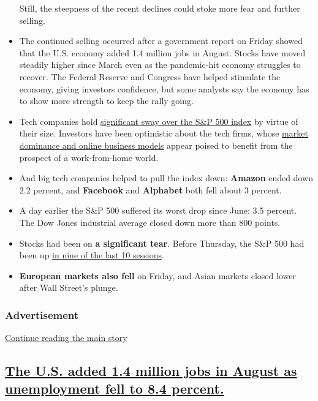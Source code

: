 \begin{itemize}
  Still, the steepness of the recent declines could stoke more fear and
  further selling.
\item
  The continued selling occurred after a government report on Friday
  showed that the U.S. economy added 1.4 million jobs in August. Stocks
  have moved steadily higher since March even as the pandemic-hit
  economy struggles to recover. The Federal Reserve and Congress have
  helped stimulate the economy, giving investors confidence, but some
  analysts say the economy has to show more strength to keep the rally
  going.
\item
  Tech companies hold
  \href{https://www.nytimes3xbfgragh.onion/2020/04/28/business/coronavirus-stocks.html}{significant
  sway over the S\&P 500 index} by virtue of their size. Investors have
  been optimistic about the tech firms, whose
  \href{https://www.nytimes3xbfgragh.onion/2020/03/23/technology/coronavirus-facebook-amazon-youtube.html}{market
  dominance and online business models} appear poised to benefit from
  the prospect of a work-from-home world.
\item
  And big tech companies helped to pull the index down: \textbf{Amazon}
  ended down 2.2 percent, and \textbf{Facebook} and \textbf{Alphabet}
  both fell about 3 percent.
\item
  A day earlier the S\&P 500 suffered its worst drop since June: 3.5
  percent. The Dow Jones industrial average closed down more than 800
  points.
\item
  Stocks had been on \textbf{a significant tear}. Before Thursday, the
  S\&P 500 had been up
  \href{https://www.nytimes3xbfgragh.onion/live/2020/09/03/business/stock-market-today-coronavirus/wall-street-has-been-on-an-extraordinary-rally-since-the-depths-of-march}{in
  nine of the last 10 sessions}.
\item
  \textbf{European markets also fell} on Friday, and Asian markets
  closed lower after Wall Street's plunge.
\end{itemize}

\hypertarget{advertisement}{%
\subsubsection{Advertisement}\label{advertisement}}

\protect\hyperlink{after-dfp-ad-mid1}{Continue reading the main story}

\hypertarget{the-us-added-14-million-jobs-in-august-as-unemployment-fell-to-84-percent}{%
\subsection{\texorpdfstring{\protect\hyperlink{jobs-report-august-2020}{The
U.S. added 1.4 million jobs in August as unemployment fell to 8.4
percent.}}{The U.S. added 1.4 million jobs in August as unemployment fell to 8.4 percent.}}\label{the-us-added-14-million-jobs-in-august-as-unemployment-fell-to-84-percent}}

